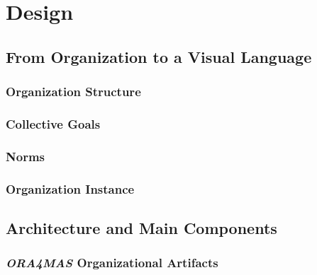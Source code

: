 \chapter{Design}

\section{From Organization to a Visual Language}
\subsection{Organization Structure}
\subsection{Collective Goals}
\subsection{Norms}
\subsection{Organization Instance}

\section{Architecture and Main Components}
\subsection{\textit{ORA4MAS} Organizational Artifacts}